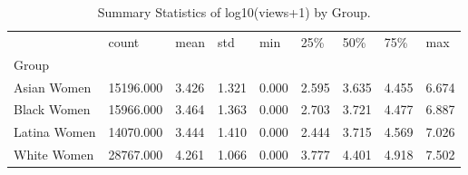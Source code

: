 \begin{table}[htbp]
\centering
\caption{Summary Statistics of log10(views+1) by Group.}
\label{tab:eda_views_stats}
\begin{tabular}{lllllllll}
\toprule
 & count & mean & std & min & 25\% & 50\% & 75\% & max \\
Group &  &  &  &  &  &  &  &  \\
\midrule
Asian Women & 15196.000 & 3.426 & 1.321 & 0.000 & 2.595 & 3.635 & 4.455 & 6.674 \\
Black Women & 15966.000 & 3.464 & 1.363 & 0.000 & 2.703 & 3.721 & 4.477 & 6.887 \\
Latina Women & 14070.000 & 3.444 & 1.410 & 0.000 & 2.444 & 3.715 & 4.569 & 7.026 \\
White Women & 28767.000 & 4.261 & 1.066 & 0.000 & 3.777 & 4.401 & 4.918 & 7.502 \\
\bottomrule
\end{tabular}

\end{table}